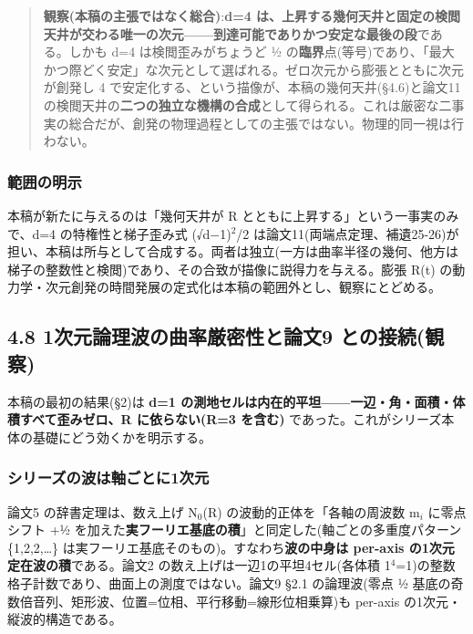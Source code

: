 \documentclass[
]{ltjsarticle}
\begin{document}
\begin{quote}
\textbf{観察(本稿の主張ではなく総合)}:\textbf{d=4
は、上昇する幾何天井と固定の検閲天井が交わる唯一の次元------到達可能でありかつ安定な最後の段}である。しかも
d=4 は検閲歪みがちょうど ½
の\textbf{臨界}点(等号)であり、「最大かつ際どく安定」な次元として選ばれる。ゼロ次元から膨張とともに次元が創発し
4 で安定化する、という描像が、本稿の幾何天井(§4.6)と論文11
の検閲天井の\textbf{二つの独立な機構の合成}として得られる。これは厳密な二事実の総合だが、創発の物理過程としての主張ではない。物理的同一視は行わない。
\end{quote}

\subsubsection{範囲の明示}\label{ux7bc4ux56f2ux306eux660eux793a}

本稿が新たに与えるのは「幾何天井が R
とともに上昇する」という一事実のみで、d=4 の特権性と梯子歪み式
(√d−1)\(^{2}\)/2
は論文11(両端点定理、補遺25-26)が担い、本稿は所与として合成する。両者は独立(一方は曲率半径の幾何、他方は梯子の整数性と検閲)であり、その合致が描像に説得力を与える。膨張
R(t)
の動力学・次元創発の時間発展の定式化は本稿の範囲外とし、観察にとどめる。

\subsection{4.8 1次元論理波の曲率厳密性と論文9
との接続(観察)}\label{ux6b21ux5143ux8ad6ux7406ux6ce2ux306eux66f2ux7387ux53b3ux5bc6ux6027ux3068ux8ad6ux65879-ux3068ux306eux63a5ux7d9aux89b3ux5bdf}

本稿の最初の結果(§2)は \textbf{d=1
の測地セルは内在的平坦------一辺・角・面積・体積すべて歪みゼロ、R
に依らない(R=3 を含む)}
であった。これがシリーズ本体の基礎にどう効くかを明示する。

\subsubsection{シリーズの波は軸ごとに1次元}\label{ux30b7ux30eaux30fcux30baux306eux6ce2ux306fux8ef8ux3054ux3068ux306b1ux6b21ux5143}

論文5 の辞書定理は、数え上げ N\(_{0}\)(R) の波動的正体を「各軸の周波数
m\(_i\) に零点シフト +½
を加えた\textbf{実フーリエ基底の積}」と同定した(軸ごとの多重度パターン
\{1,2,2,\ldots\} は実フーリエ基底そのもの)。すなわち\textbf{波の中身は
per-axis の1次元定在波の積}である。論文2
の数え上げは一辺1の平坦4セル(各体積
1\(^{4}\)=1)の整数格子計数であり、曲面上の測度ではない。論文9 §2.1
の論理波(零点 ½
基底の奇数倍音列、矩形波、位置=位相、平行移動=線形位相乗算)も per-axis
の1次元・縦波的構造である。
\end{document}
